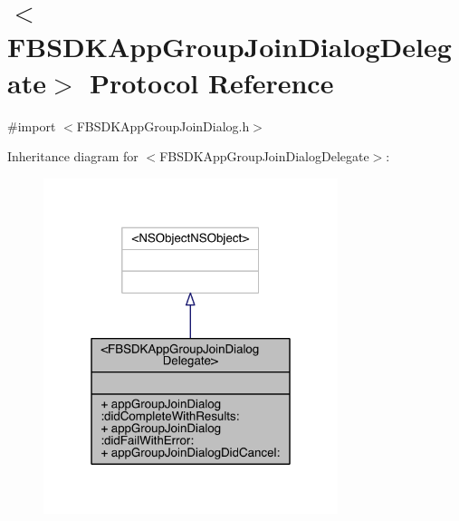 \hypertarget{protocol_f_b_s_d_k_app_group_join_dialog_delegate-p}{\section{$<$F\-B\-S\-D\-K\-App\-Group\-Join\-Dialog\-Delegate$>$ Protocol Reference}
\label{protocol_f_b_s_d_k_app_group_join_dialog_delegate-p}
}


{\ttfamily \#import $<$F\-B\-S\-D\-K\-App\-Group\-Join\-Dialog.\-h$>$}



Inheritance diagram for $<$F\-B\-S\-D\-K\-App\-Group\-Join\-Dialog\-Delegate$>$\-:
\nopagebreak
\begin{figure}[H]
\begin{center}
\leavevmode
\includegraphics[width=244pt]{protocol_f_b_s_d_k_app_group_join_dialog_delegate-p__inherit__graph}
\end{center}
\end{figure}


